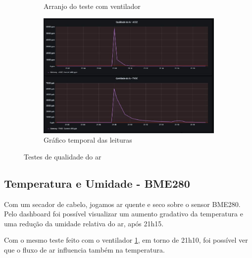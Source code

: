 \documentclass[../monografia.tex]{subfiles}
\begin{document}
\begin{figure}[h]
\begin{subfigure}{0.5\textwidth}
		\caption{Arranjo do teste com ventilador}
		\label{fig:ventilador}
	\end{subfigure}%
	\hfill
	\begin{subfigure}{0.6\textwidth}
		\centering
		\includegraphics[width=\textwidth]{dashboard-ar}
		\caption{Gráfico temporal das leituras}
		\label{fig:dash-ar}
	\end{subfigure}
	\caption{Testes de qualidade do ar}
	\label{fig:teste-sgp30}
\end{figure}

\subsection{Temperatura e Umidade - BME280}

Com um secador de cabelo, jogamos ar quente e seco sobre o sensor BME280. Pelo dashboard foi possível visualizar um aumento gradativo da temperatura e uma redução da umidade relativa do ar, após 21h15.

Com o mesmo teste feito com o ventilador \ref{fig:ventilador}, em torno de 21h10, foi possível ver que o fluxo de ar influencia também na temperatura.
\end{document}
